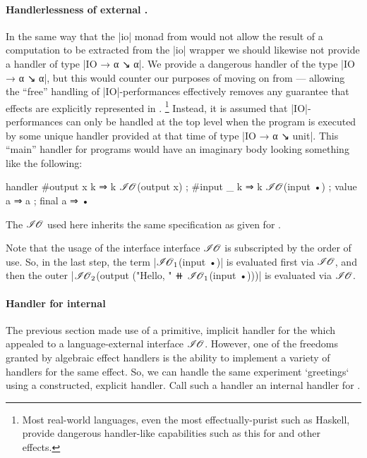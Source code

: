 \paragraph{Handlerlessness of external \IO.}
%
In the same way that the \code|io| monad from \LangC would not allow the result of a computation to be extracted from the \code|io| wrapper we should
likewise not provide a handler of type \code|IO → α ↘ α|.
We  provide a dangerous handler of the type \code|IO → α ↘ α|, but this would counter our purposes of moving on from \LangB --- allowing the ``free'' handling of \code|IO|-performances effectively removes any guarantee that \IO effects are explicitly represented in \LangD.%
\footnote{
  Most real-world languages, even the most effectually-purist such as Haskell, provide dangerous handler-like capabilities such as this for \IO and other effects.
}
Instead, it is assumed that \code|IO|-performances can only be handled at the top level when the program is executed by some unique handler provided at that time of type  \code|IO → α ↘ unit|.
This ``main'' handler for \IO programs would have an imaginary body looking something like the following:
%
\begin{snippet}[caption={Imaginary body for \code`external`}]
handler
  { #output x k ⇒ k $\mathscr{I\hspace{-0.1em}O}$(output x)
  ; #input  _ k ⇒ k $\mathscr{I\hspace{-0.1em}O}$(input •)
  ; value     a ⇒ a
  ; final     a ⇒ • }
\end{snippet}
%
The $\mathscr{I\hspace{-0.1em}O}$ used here inherits the same specification as given for \LangB.



Note that the usage of the interface \IO interface $\mathscr{I\hspace{-0.1em}O}$ is subscripted by the order of use.
So, in the last  step, the term \code|$\mathscr{I\hspace{-0.1em}O}_1$(input •)| is evaluated first via $\mathscr{I\hspace{-0.1em}O}$, and then the outer \code|$\mathscr{I\hspace{-0.1em}O}_2$(output ("Hello, " ⧺ $\mathscr{I\hspace{-0.1em}O}_1$(input •)))| is evaluated via $\mathscr{I\hspace{-0.1em}O}$.

\paragraph{Handler for internal \IO}
The previous section made use of a primitive, implicit handler for the \IO which appealed to a language-external interface $\mathscr{I\hspace{-0.1em}O}$.
However, one of the freedoms granted by algebraic effect handlers is the ability to implement a variety of handlers for the same effect.
So, we can handle the same experiment \code`greetings` using a constructed, explicit handler.
Call such a handler an internal handler for \IO.

